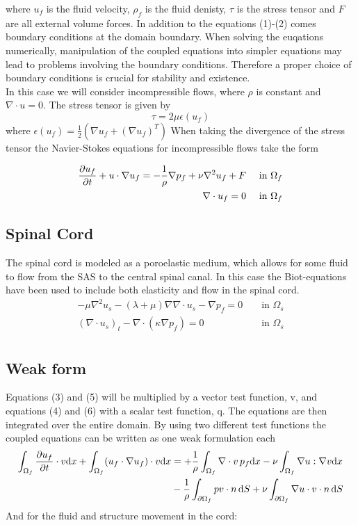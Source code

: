 where $u_f$ is the fluid velocity, $\rho_f$ is the fluid denisty, $\tau$ is the stress tensor and $F$ are all external volume forces. In addition to the equations (1)-(2) comes boundary conditions at the domain boundary. When solving the euqations numerically, manipulation of the coupled equations into simpler equations may lead to problems involving the boundary conditions. Therefore a proper choice of boundary conditions is crucial for stability and existence. 
\\
In this case we will consider incompressible flows, where $\rho$ is constant and $\nabla \cdot u = 0$. The stress tensor is given by
\[ \tau = 2 \mu \epsilon(u_f) \]
where $\epsilon(u_f) = \frac{1}{2}(\nabla u_f + (\nabla u_f)^T)$
When taking the divergence of the stress tensor the Navier-Stokes equations for incompressible flows take the form

\begin{align}
	\frac{\partial u_f}{\partial t} + u\cdot \nabla u_f = -\frac{1}{\rho}\nabla p_f + \nu \nabla ^2 u_f + F && 	\text{ in } \Omega_f 
	\\
	\nabla \cdot u_f = 0 && \text{ in } \Omega_f
\end{align}

\subsection*{Spinal Cord}
The spinal cord is modeled as a poroelastic medium, which allows for some fluid to flow from the SAS to the central spinal canal. In this case the Biot-equations have been used to include both elasticity and flow in the spinal cord.
	\begin{align} -\mu \nabla ^2 u_s - (\lambda + \mu)\nabla \nabla \cdot u_s - \nabla p_f = 0 		&& \text{ in } \Omega_s \\
	(\nabla \cdot u_s)_t - \nabla \cdot (\kappa \nabla p_f) = 0 && \text{ in } \Omega_s \\
\end{align}

\subsection{Weak form}
Equations (3) and (5) will be multiplied by a vector test function, v, and equations (4) and (6) with a scalar test function, q. The equations are then integrated over the entire domain. By using two different test functions the coupled equations can be written as one weak formulation each
\begin{align}
	\int_{\Omega_f} \frac{\partial u_f}{\partial t}\cdot v \mathrm{d}x + \int_{\Omega_f}(u_f \cdot \nabla u_f)\cdot v \mathrm{d}x &= +\frac{1}{\rho} \int_{\Omega_f} \nabla \cdot v \, p_f \mathrm{d}x - \nu \int_{\Omega_f} \nabla u : \nabla v \mathrm{d}x \nonumber
	\\& - \frac{1}{\rho}\int_{\partial \Omega_f} p v\cdot n \, \mathrm{d}S + \nu \int_{\partial \Omega_f} \nabla u \cdot v \cdot n \,\mathrm{d}S
\end{align}
And for the fluid and structure movement in the cord:

